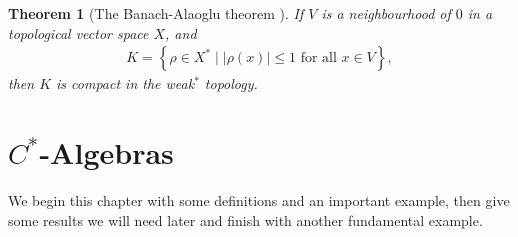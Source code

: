 \documentclass[11pt,a4paper]{report}
\theoremstyle{plain}
\newtheorem*{thm*}{Theorem}
\theoremstyle{definition}
\newcommand{\1}{\mathbbm{1}}
\begin{document}
\begin{thm*}[{The Banach-Alaoglu theorem \cite{rudin91}}]
	If $V$ is a neighbourhood of $0$ in a topological vector space $X$, and
	\begin{align*}
		K=\left\{\rho\in X^\ast \mid |\rho(x)|\leq 1 \mbox{ for all } x \in V \right\},
	\end{align*}
	then $K$ is compact in the weak$^\ast$ topology.
\end{thm*}

\chapter{$C^\ast$-Algebras}
We begin this chapter with some definitions and an important example, then give 
some results we will need later and finish with another fundamental example.
\end{document}
